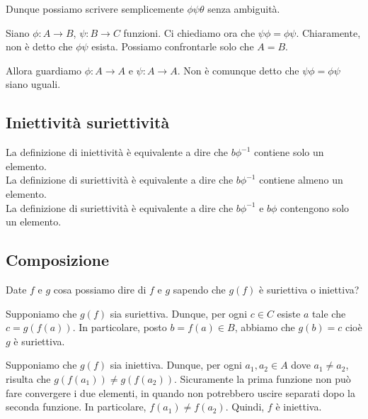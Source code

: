 \documentclass[a4paper]{article}
\begin{document}
Dunque possiamo scrivere semplicemente \(\phi\psi\theta\) senza ambiguità.

Siano \(\phi \colon A \to B\), \(\psi\colon B\to C\) funzioni. 
Ci chiediamo ora che \(\psi\phi = \phi\psi\). Chiaramente, non è detto
che \(\phi\psi\) esista. Possiamo confrontarle solo che \(A=B\).

Allora guardiamo \(\phi \colon A\to A\) e \(\psi \colon A\to A\).
Non è comunque detto che \(\psi\phi = \phi\psi\) siano uguali.



\subsection{Iniettività suriettività}

La definizione di iniettività è equivalente a dire che \(b\phi^{-1}\) contiene solo un elemento. \\
La definizione di suriettività è equivalente a dire che \(b\phi^{-1}\) contiene almeno un elemento. \\
La definizione di suriettività è equivalente a dire che \(b\phi^{-1}\) e \(b\phi\) contengono solo un elemento.

\subsection{Composizione}

Date \(f\) e \(g\) cosa possiamo dire di \(f\) e \(g\) sapendo che \(g(f)\) è suriettiva o iniettiva?

Supponiamo che \(g(f)\) sia suriettiva.
Dunque, per ogni \(c\in C\) esiste \(a\) tale che \(c=g(f(a))\).
In particolare, posto \(b=f(a) \in B\), abbiamo che \(g(b)=c\) cioè \(g\) è suriettiva.

Supponiamo che \(g(f)\) sia iniettiva.
Dunque, per ogni \(a_1, a_2 \in A\) dove \(a_1 \neq a_2\), risulta che \(g(f(a_1)) \neq g(f(a_2))\).
Sicuramente la prima funzione non può fare convergere i due elementi, in quando non potrebbero uscire separati
dopo la seconda funzione.
In particolare, \(f(a_1) \neq f(a_2)\). Quindi, \(f\) è iniettiva.
\end{document}
